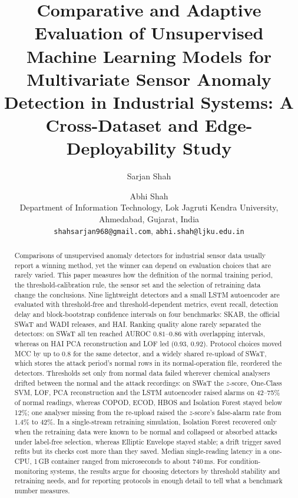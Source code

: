 \documentclass[11pt]{article}
\title{Comparative and Adaptive Evaluation of Unsupervised Machine Learning Models
for Multivariate Sensor Anomaly Detection in Industrial Systems:
A Cross-Dataset and Edge-Deployability Study}
\author{Sarjan Shah \and Abhi Shah\\[2pt]
\small Department of Information Technology, Lok Jagruti Kendra University, Ahmedabad, Gujarat, India\\
\small \texttt{shahsarjan968@gmail.com}, \texttt{abhi.shah@ljku.edu.in}}
\date{}
\begin{document}
\maketitle
\let\thefootnote\relax{}

\begin{abstract}
Comparisons of unsupervised anomaly detectors for industrial sensor data usually report
a winning method, yet the winner can depend on evaluation choices that are rarely varied.
This paper measures how the definition of the normal training period, the
threshold-calibration rule, the sensor set and the selection of retraining data change
the conclusions. Nine lightweight detectors and a small LSTM autoencoder are evaluated
with threshold-free and threshold-dependent metrics, event recall, detection delay and
block-bootstrap confidence intervals on four benchmarks: SKAB, the official SWaT and WADI
releases, and HAI. Ranking quality alone rarely separated the detectors: on SWaT all ten
reached AUROC $0.81$--$0.86$ with overlapping intervals, whereas on HAI PCA reconstruction
and LOF led ($0.93$, $0.92$). Protocol choices moved MCC by up to $0.8$ for the same
detector, and a widely shared re-upload of SWaT, which stores the attack period's normal
rows in its normal-operation file, reordered the detectors. Thresholds set only from
normal data failed wherever chemical analysers drifted between the normal and the attack
recordings: on SWaT the $z$-score, One-Class SVM, LOF, PCA reconstruction and the LSTM
autoencoder raised alarms on 42--75\% of normal readings, whereas COPOD, ECOD, HBOS and
Isolation Forest stayed below 12\%; one analyser missing from the re-upload raised the
$z$-score's false-alarm rate from 1.4\% to 42\%. In a single-stream retraining simulation,
Isolation Forest recovered only when the retraining data were known to be normal and
collapsed or absorbed attacks under label-free selection, whereas Elliptic Envelope stayed
stable; a drift trigger saved refits but its checks cost more than they saved. Median
single-reading latency in a one-CPU, 1\,GB container ranged from microseconds to about
740\,ms. For condition-monitoring systems, the results argue for choosing detectors by
threshold stability and retraining needs, and for reporting protocols in enough detail to
tell what a benchmark number measures.
\end{abstract}
\end{document}
